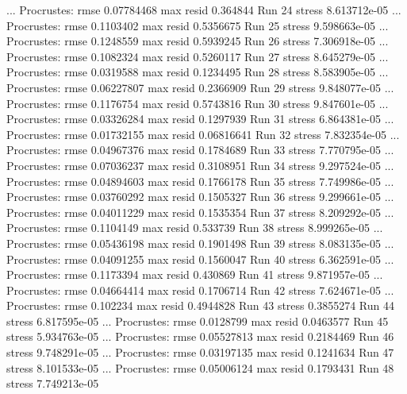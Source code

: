 \documentclass[
]{book}
\newenvironment{Shaded}{\begin{snugshade}}{\end{snugshade}}
\newcommand{\NormalTok}[1]{#1}
\begin{document}
\begin{Shaded}
\begin{Highlighting}[]
\NormalTok{... Procrustes: rmse 0.07784468  max resid 0.364844 }
\NormalTok{Run 24 stress 8.613712e{-}05 }
\NormalTok{... Procrustes: rmse 0.1103402  max resid 0.5356675 }
\NormalTok{Run 25 stress 9.598663e{-}05 }
\NormalTok{... Procrustes: rmse 0.1248559  max resid 0.5939245 }
\NormalTok{Run 26 stress 7.306918e{-}05 }
\NormalTok{... Procrustes: rmse 0.1082324  max resid 0.5260117 }
\NormalTok{Run 27 stress 8.645279e{-}05 }
\NormalTok{... Procrustes: rmse 0.0319588  max resid 0.1234495 }
\NormalTok{Run 28 stress 8.583905e{-}05 }
\NormalTok{... Procrustes: rmse 0.06227807  max resid 0.2366909 }
\NormalTok{Run 29 stress 9.848077e{-}05 }
\NormalTok{... Procrustes: rmse 0.1176754  max resid 0.5743816 }
\NormalTok{Run 30 stress 9.847601e{-}05 }
\NormalTok{... Procrustes: rmse 0.03326284  max resid 0.1297939 }
\NormalTok{Run 31 stress 6.864381e{-}05 }
\NormalTok{... Procrustes: rmse 0.01732155  max resid 0.06816641 }
\NormalTok{Run 32 stress 7.832354e{-}05 }
\NormalTok{... Procrustes: rmse 0.04967376  max resid 0.1784689 }
\NormalTok{Run 33 stress 7.770795e{-}05 }
\NormalTok{... Procrustes: rmse 0.07036237  max resid 0.3108951 }
\NormalTok{Run 34 stress 9.297524e{-}05 }
\NormalTok{... Procrustes: rmse 0.04894603  max resid 0.1766178 }
\NormalTok{Run 35 stress 7.749986e{-}05 }
\NormalTok{... Procrustes: rmse 0.03760292  max resid 0.1505327 }
\NormalTok{Run 36 stress 9.299661e{-}05 }
\NormalTok{... Procrustes: rmse 0.04011229  max resid 0.1535354 }
\NormalTok{Run 37 stress 8.209292e{-}05 }
\NormalTok{... Procrustes: rmse 0.1104149  max resid 0.533739 }
\NormalTok{Run 38 stress 8.999265e{-}05 }
\NormalTok{... Procrustes: rmse 0.05436198  max resid 0.1901498 }
\NormalTok{Run 39 stress 8.083135e{-}05 }
\NormalTok{... Procrustes: rmse 0.04091255  max resid 0.1560047 }
\NormalTok{Run 40 stress 6.362591e{-}05 }
\NormalTok{... Procrustes: rmse 0.1173394  max resid 0.430869 }
\NormalTok{Run 41 stress 9.871957e{-}05 }
\NormalTok{... Procrustes: rmse 0.04664414  max resid 0.1706714 }
\NormalTok{Run 42 stress 7.624671e{-}05 }
\NormalTok{... Procrustes: rmse 0.102234  max resid 0.4944828 }
\NormalTok{Run 43 stress 0.3855274 }
\NormalTok{Run 44 stress 6.817595e{-}05 }
\NormalTok{... Procrustes: rmse 0.0128799  max resid 0.0463577 }
\NormalTok{Run 45 stress 5.934763e{-}05 }
\NormalTok{... Procrustes: rmse 0.05527813  max resid 0.2184469 }
\NormalTok{Run 46 stress 9.748291e{-}05 }
\NormalTok{... Procrustes: rmse 0.03197135  max resid 0.1241634 }
\NormalTok{Run 47 stress 8.101533e{-}05 }
\NormalTok{... Procrustes: rmse 0.05006124  max resid 0.1793431 }
\NormalTok{Run 48 stress 7.749213e{-}05 }

\end{Highlighting}
\end{Shaded}
\end{document}
